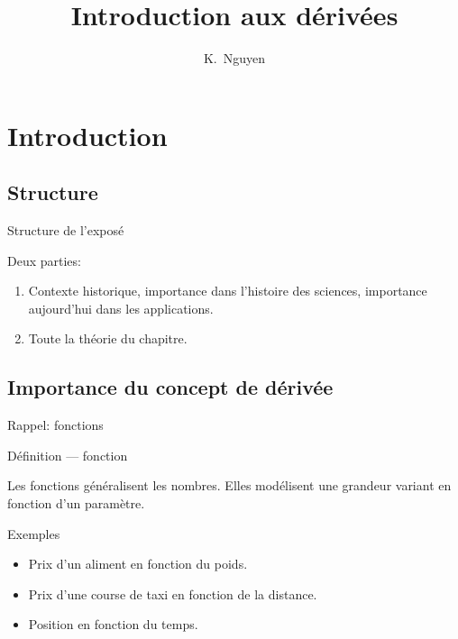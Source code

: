 \documentclass{beamer}
\title{Introduction aux dérivées}
\author{K.~Nguyen}
\begin{document}
\maketitle

\section{Introduction}

\subsection{Structure}

\begin{frame}
    {Structure de l'exposé}

    Deux parties:
    \begin{enumerate}
        \item Contexte historique,
            importance dans l'histoire des sciences,
            importance aujourd'hui dans les applications.
            \pause{}
        \item Toute la théorie du chapitre.
    \end{enumerate}
\end{frame}

\subsection{Importance du concept de dérivée}

\begin{frame}
    {Rappel: fonctions}

    \begin{exampleblock}
        {Définition --- fonction}

        Les fonctions généralisent les nombres.
        Elles modélisent une grandeur variant en fonction d'un paramètre.
    \end{exampleblock}

    \pause{}
    \begin{exampleblock}
        {Exemples}

        \begin{itemize}
            \item Prix d'un aliment en fonction du poids.
                \pause{}
            \item Prix d'une course de taxi en fonction de la distance.
                \pause{}
            \item Position en fonction du temps.
        \end{itemize}
    \end{exampleblock}
\end{frame}
\end{document}
